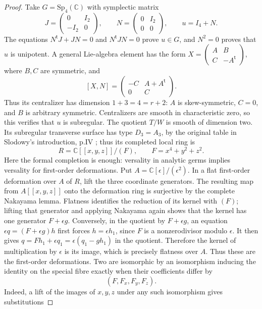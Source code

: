 \begin{proof}
Take $G=\mathrm{Sp}_4(\mathbb C)$ with symplectic matrix
\[
 J=\begin{pmatrix}0&I_2\\-I_2&0\end{pmatrix},\qquad
 N=\begin{pmatrix}0&I_2\\0&0\end{pmatrix},\qquad
 u=I_4+N .
\]
The equations $N^{\mathsf t}J+JN=0$ and
$N^{\mathsf t}JN=0$ prove $u\in G$, and $N^2=0$
proves that $u$ is unipotent.  A general Lie-algebra
element has the form
$X=\left(\begin{smallmatrix}A&B\\C&-A^{\mathsf t}\end{smallmatrix}\right)$,
where $B,C$ are symmetric, and
\[
 [X,N]=
 \begin{pmatrix}-C&A+A^{\mathsf t}\\0&C\end{pmatrix}.
\]
Thus its centralizer has dimension $1+3=4=r+2$:
$A$ is skew-symmetric, $C=0$, and $B$ is arbitrary
symmetric.  Centralizers are smooth in characteristic
zero, so this verifies that $u$ is subregular.
The quotient $T/W$ is smooth of dimension two.  Its subregular
transverse surface has type $D_3=A_3$, by the original
table in Slodowy's introduction, p.IV
\cite{D-Slodowy}; thus its completed local ring is
\[
 R=\mathbb C[[x,y,z]]/(F),\qquad
 F=x^4+y^2+z^2 .
\]
Here the formal completion is enough: versality in
analytic germs implies versality for first-order
deformations.  Put $A=\mathbb C[\epsilon]/(\epsilon^2)$.
In a flat first-order deformation over $A$ of
$R$, lift the three coordinate generators.  The resulting
map from $A[[x,y,z]]$ onto the deformation ring is
surjective by the complete Nakayama lemma.  Flatness
identifies the reduction of its kernel with $(F)$;
lifting that generator and applying Nakayama again shows
that the kernel has one generator $F+\epsilon g$.
Conversely, in the quotient by $F+\epsilon g$, an
equation $\epsilon q=(F+\epsilon g)h$ first forces
$h=\epsilon h_1$, since $F$ is a nonzerodivisor modulo
$\epsilon$.  It then gives
$q=Fh_1+\epsilon q_1=\epsilon(q_1-gh_1)$ in the
quotient.  Therefore the kernel of multiplication by
$\epsilon$ is its image, which is precisely flatness
over $A$.  Thus these are the first-order deformations.
Two are isomorphic by an isomorphism inducing the
identity on the special fibre exactly when their
coefficients differ by
\[
 (F,F_x,F_y,F_z).
\]
Indeed, a lift of the images of $x,y,z$ under any such
isomorphism gives substitutions

\end{proof}
